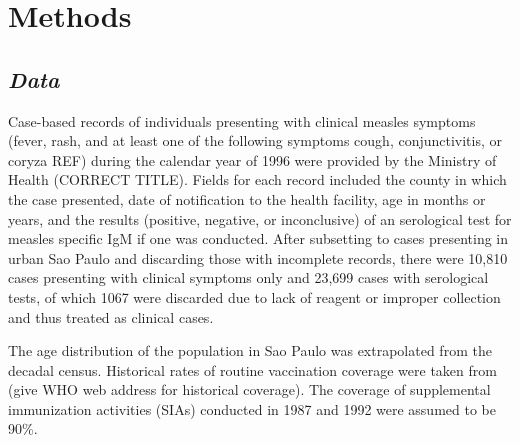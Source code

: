 \section{\texorpdfstring{\textbf{Methods}}{Methods}}\label{methods}

\subsection{\texorpdfstring{\emph{Data}}{Data}}\label{data}

Case-based records of individuals presenting with clinical measles
symptoms (fever, rash, and at least one of the following symptoms cough,
conjunctivitis, or coryza REF) during the calendar year of 1996 were
provided by the Ministry of Health (CORRECT TITLE). Fields for each
record included the county in which the case presented, date of
notification to the health facility, age in months or years, and the
results (positive, negative, or inconclusive) of an serological test for
measles specific IgM if one was conducted. After subsetting to cases
presenting in urban Sao Paulo and discarding those with incomplete
records, there were 10,810 cases presenting with clinical symptoms only
and 23,699 cases with serological tests, of which 1067 were discarded
due to lack of reagent or improper collection and thus treated as
clinical cases.

The age distribution of the population in Sao Paulo was extrapolated
from the decadal census. Historical rates of routine vaccination
coverage were taken from (give WHO web address for historical coverage).
The coverage of supplemental immunization activities (SIAs) conducted in
1987 and 1992 were assumed to be 90\%.